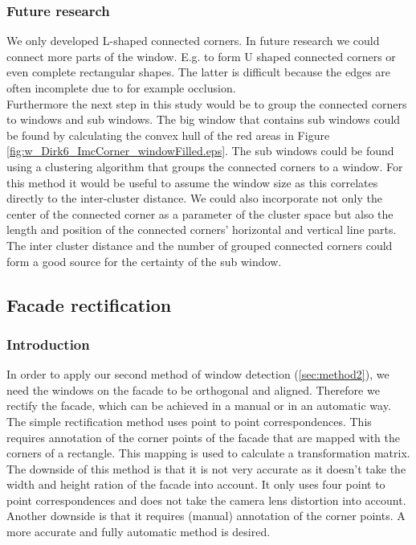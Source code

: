 \subsubsection{Future research} %
We only developed L-shaped connected corners. In future research we could
connect more parts of the window. E.g. to form U shaped connected corners or
even complete rectangular shapes. The latter is difficult because the edges are
often incomplete due to for example occlusion.\\

Furthermore the next step in this study would be to group the connected corners
to windows and sub windows.  The big window that contains sub windows could be
found by calculating the convex hull of the red areas in Figure
\ref{fig:w_Dirk6_ImcCorner_windowFilled.eps}.  The sub windows could be found
using a clustering algorithm that groups the connected corners to a window. For
this method it would be useful to assume the window size as this correlates
directly to the inter-cluster distance.  
We could also incorporate not only the center of the connected corner as a
parameter of the cluster space but also the length and position of the
connected corners' horizontal and vertical line parts.  The inter cluster
distance and the number of grouped connected corners could form a good source for
the certainty of the sub window.\\







\subsection{Facade rectification}
\subsubsection{Introduction}
In order to apply our second method of window detection (\ref{sec:method2}),
we need the windows on the facade to be orthogonal and aligned.
Therefore we rectify the facade, which can be achieved in a manual or in an automatic way.\\

The simple rectification method uses point to point correspondences. This 
requires annotation of the corner points of the facade that are mapped with the
corners of a rectangle. This mapping is used to calculate a transformation matrix. 
 The downside of this method is that it is not very accurate as it doesn't take
 the width and height ration of the facade into account.
It only uses four point to point correspondences 
and does not take the camera lens distortion into account.
 Another downside is that it requires (manual) annotation of the corner points.
A more accurate and fully automatic method is desired.\\


